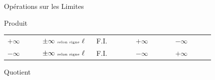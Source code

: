 \documentclass{coursbook}
\begin{document}
\begin{Gpartie}{Opérations sur les Limites}
\begin{Spartie}{Produit}
\begin{table}[H]
{\begin{tabular}{ p{0.15\linewidth} *{4}{M{0.17\linewidth} }}
                        $+\infty$   & $\pm\infty~\text{\tiny{selon signe}}~\ell$    & F.I.& $+\infty$                                   & $-\infty$                                     \\
                        $-\infty$   & $\pm\infty~\text{\tiny{selon signe}}~\ell$    & F.I.& $-\infty$                                   & $+\infty$                                     \\ \bottomrule
                    \end{tabular}
                }
            \end{table}
        \end{Spartie}
        \vspace{-2ex}
        \begin{Spartie}{Quotient}
            \vspace{-2ex}
            \begin{table}[H]%
                \centering {}
\end{table}
\end{Spartie}
\end{Gpartie}
\end{document}
